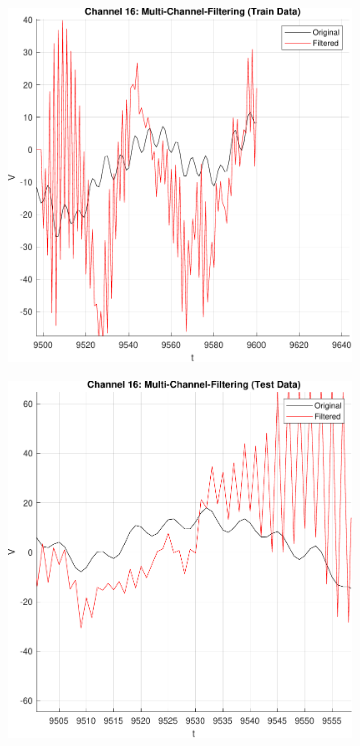 \documentclass[12pt]{article} %
\begin{document}
\begin{figure}[ht!]
    \centering
    \begin{subfigure}[b]{0.45\textwidth}
        \includegraphics[width=\textwidth]{plot/multi_channel_filtering_train.pdf}
        \caption{}
        \label{fig:multi_channel_filtering_train}
    \end{subfigure}
    \hfill
    \begin{subfigure}[b]{0.45\textwidth}
        \includegraphics[width=\textwidth]{plot/multi_channel_filtering_test.pdf}
        \caption{}
        \label{fig:multi_channel_filtering_test}
    \end{subfigure}


\end{figure}
\end{document}
